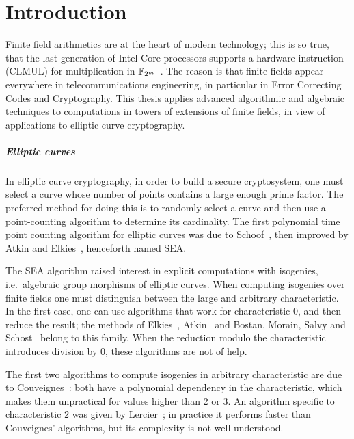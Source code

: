 \chapter[Intoduction (English)][Introduction]{Introduction}

Finite field arithmetics are at the heart of modern technology; this
is so true, that the last generation of Intel Core processors supports
a hardware instruction (CLMUL) for multiplication in
$\mathbb{F}_{2^m}$~\cite{intel-carryless}. The reason is that finite fields
appear everywhere in telecommunications engineering, in particular in
Error Correcting Codes and Cryptography. This thesis applies advanced
algorithmic and algebraic techniques to computations in towers of
extensions of finite fields, in view of applications to elliptic curve
cryptography.


\paragraph*{Elliptic curves}
In elliptic curve cryptography, in order to build a secure
cryptosystem, one must select a curve whose number of points contains
a large enough prime factor. The preferred method for doing this is to
randomly select a curve and then use a point-counting algorithm to
determine its cardinality. The first polynomial time point counting
algorithm for elliptic curves was due to Schoof~\cite{schoof85}, then
improved by Atkin and Elkies~\cite{atkin88,elkies98,schoof95},
henceforth named SEA.

The SEA algorithm raised interest in explicit computations with
isogenies, i.e.\ algebraic group morphisms of elliptic curves. When
computing isogenies over finite fields one must distinguish between
the large and arbitrary characteristic. In the first case, one can use
algorithms that work for characteristic $0$, and then reduce the
result; the methods of Elkies~\cite{elkies98,morain95},
Atkin~\cite{schoof95} and Bostan, Morain, Salvy and
Schost~\cite{bostan+morain+salvy+schost08} belong to this family. When
the reduction modulo the characteristic introduces division by $0$,
these algorithms are not of help.

The first two algorithms to compute isogenies in arbitrary
characteristic are due to Couveignes~\cite{couveignes94,couveignes96}:
both have a polynomial dependency in the characteristic, which makes
them unpractical for values higher than $2$ or $3$. An algorithm
specific to characteristic $2$ was given by Lercier~\cite{lercier96};
in practice it performs faster than Couveignes' algorithms, but its
complexity is not well understood. 

